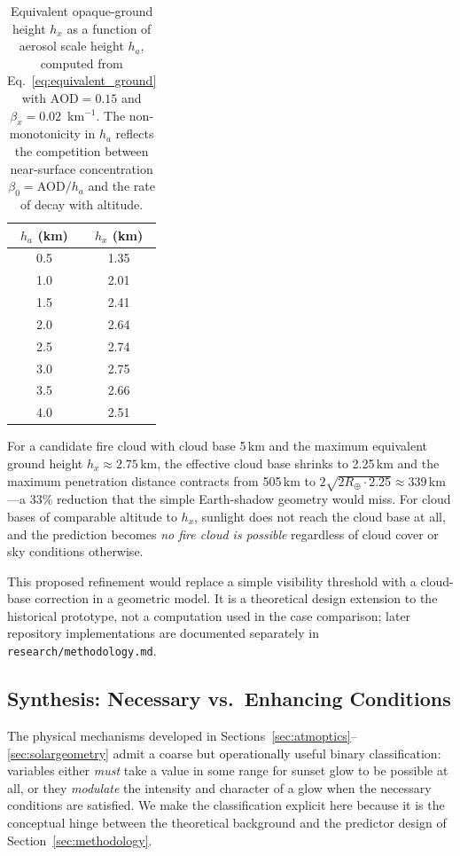 \documentclass[11pt,a4paper]{article}
\newcommand{\AOD}{\text{AOD}}
\begin{document}
\begin{table}[H]
\centering
\small
\begin{tabular}{cc}
\toprule
$h_a$ (km) & $h_x$ (km) \\
\midrule
0.5 & 1.35 \\
1.0 & 2.01 \\
1.5 & 2.41 \\
2.0 & 2.64 \\
2.5 & 2.74 \\
3.0 & 2.75 \\
3.5 & 2.66 \\
4.0 & 2.51 \\
\bottomrule
\end{tabular}
\caption{Equivalent opaque-ground height $h_x$ as a function of aerosol scale height $h_a$, computed from Eq.~\ref{eq:equivalent_ground} with $\AOD = 0.15$ and $\beta_x = 0.02$~km$^{-1}$. The non-monotonicity in $h_a$ reflects the competition between near-surface concentration $\beta_0 = \AOD / h_a$ and the rate of decay with altitude.}
\label{tab:hxvalues}
\end{table}

For a candidate fire cloud with cloud base 5\,km and the maximum equivalent ground height $h_x \approx 2.75$\,km, the effective cloud base shrinks to 2.25\,km and the maximum penetration distance contracts from 505\,km to $2\sqrt{2 R_\oplus \cdot 2.25} \approx 339$\,km---a 33\% reduction that the simple Earth-shadow geometry would miss. For cloud bases of comparable altitude to $h_x$, sunlight does not reach the cloud base at all, and the prediction becomes \emph{no fire cloud is possible} regardless of cloud cover or sky conditions otherwise.

This proposed refinement would replace a simple visibility threshold with a cloud-base correction in a geometric model. It is a theoretical design extension to the historical prototype, not a computation used in the case comparison; later repository implementations are documented separately in \texttt{research/methodology.md}.

\subsection{Synthesis: Necessary vs.\ Enhancing Conditions}
\label{sec:synthesis}

The physical mechanisms developed in Sections~\ref{sec:atmoptics}--\ref{sec:solargeometry} admit a coarse but operationally useful binary classification: variables either \emph{must} take a value in some range for sunset glow to be possible at all, or they \emph{modulate} the intensity and character of a glow when the necessary conditions are satisfied. We make the classification explicit here because it is the conceptual hinge between the theoretical background and the predictor design of Section~\ref{sec:methodology}.
\end{document}
